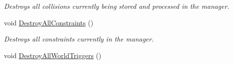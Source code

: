 \begin{DoxyCompactItemize}
\begin{DoxyCompactList}\small\item\em Destroys all collisions currently being stored and processed in the manager. \item\end{DoxyCompactList}\item 
void \hyperlink{classMezzanine_1_1PhysicsManager_a8f127a13daa6fc9bbd3bf0e0237239fe}{DestroyAllConstraints} ()
\begin{DoxyCompactList}\small\item\em Destroys all constraints currently in the manager. \item\end{DoxyCompactList}\item 
\hypertarget{classMezzanine_1_1PhysicsManager_a91386ac53ea08838f8e733459a2f3b74}{
void \hyperlink{classMezzanine_1_1PhysicsManager_a91386ac53ea08838f8e733459a2f3b74}{DestroyAllWorldTriggers} ()}
\label{classMezzanine_1_1PhysicsManager_a91386ac53ea08838f8e733459a2f3b74}


\end{DoxyCompactItemize}
